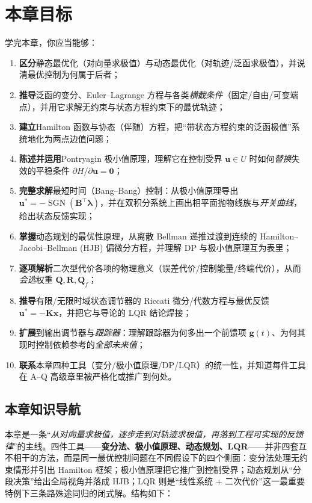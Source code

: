\section*{本章目标}
学完本章，你应当能够：
\begin{enumerate}
  \item \textbf{区分}静态最优化（对向量求极值）与动态最优化（对轨迹/泛函求极值），并说清最优控制为何属于后者；
  \item \textbf{推导}泛函的变分、Euler--Lagrange 方程与各类\emph{横截条件}（固定/自由/可变端点），并用它求解无约束与状态方程约束下的最优轨迹；
  \item \textbf{建立}Hamilton 函数与协态（伴随）方程，把“带状态方程约束的泛函极值”系统地化为两点边值问题；
  \item \textbf{陈述并运用}Pontryagin 极小值原理，理解它在控制受界 $\mathbf{u}\in U$ 时如何\emph{替换}失效的平稳条件 $\partial H/\partial\mathbf{u}=\mathbf{0}$；
  \item \textbf{完整求解}最短时间（Bang--Bang）控制：从极小值原理导出 $\mathbf{u}^*=-\operatorname{SGN}(\mathbf{B}^\top\boldsymbol\lambda)$，并在双积分系统上画出相平面抛物线族与\emph{开关曲线}，给出状态反馈实现；
  \item \textbf{掌握}动态规划的最优性原理，从离散 Bellman 递推过渡到连续的 Hamilton--Jacobi--Bellman (HJB) 偏微分方程，并理解 DP 与极小值原理互为表里；
  \item \textbf{逐项解析}二次型代价各项的物理意义（误差代价/控制能量/终端代价），从而\emph{会选}权重 $\mathbf{Q},\mathbf{R},\mathbf{Q}_f$；
  \item \textbf{推导}有限/无限时域状态调节器的 Riccati 微分/代数方程与最优反馈 $\mathbf{u}^*=-\mathbf{K}\mathbf{x}$，并把它与导论的 LQR 结论焊接；
  \item \textbf{扩展}到输出调节器与\emph{跟踪器}：理解跟踪器为何多出一个前馈项 $\mathbf{g}(t)$、为何其现时控制依赖参考的\emph{全部未来值}；
  \item \textbf{联系}本章四种工具（变分/极小值原理/DP/LQR）的统一性，并知道每件工具在 A--Q 高级章里被严格化或推广到何处。
\end{enumerate}

\subsection*{本章知识导航}
本章是一条“\emph{从对向量求极值，逐步走到对轨迹求极值，再落到工程可实现的反馈律}”的主线。四件工具——\textbf{变分法、极小值原理、动态规划、LQR}——并非四套互不相干的方法，而是同一最优控制问题在不同假设下的四个侧面：变分法处理无约束情形并引出 Hamilton 框架；极小值原理把它推广到控制受界；动态规划从“分段决策”给出全局视角并落成 HJB；LQR 则是“线性系统 + 二次代价”这一最重要特例下三条路殊途同归的闭式解。结构如下：

